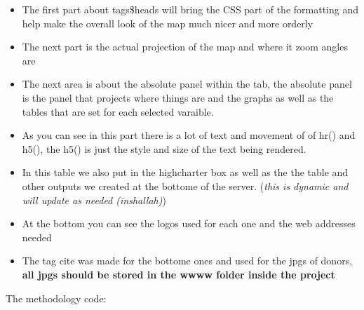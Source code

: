 \documentclass[
]{article}
\providecommand{\tightlist}{%
  \setlength{\itemsep}{0pt}\setlength{\parskip}{0pt}}
\begin{document}
\begin{itemize}
\tightlist
\item
  The first part about tags\$heads will bring the CSS part of the
  formatting and help make the overall look of the map much nicer and
  more orderly
\item
  The next part is the actual projection of the map and where it zoom
  angles are
\item
  The next area is about the absolute panel within the tab, the absolute
  panel is the panel that projects where things are and the graphs as
  well as the tables that are set for each selected varaible.
\item
  As you can see in this part there is a lot of text and movement of of
  hr() and h5(), the h5() is just the style and size of the text being
  rendered.
\item
  In this table we also put in the highcharter box as well as the the
  table and other outputs we created at the bottome of the server.
  (\emph{this is dynamic and will update as needed (inshallah)})
\item
  At the bottom you can see the logos used for each one and the web
  addresses needed
\item
  The tag cite was made for the bottome ones and used for the jpgs of
  donors, \textbf{all jpgs should be stored in the wwww folder inside
  the project}
\end{itemize}

The methodology code:
\end{document}
